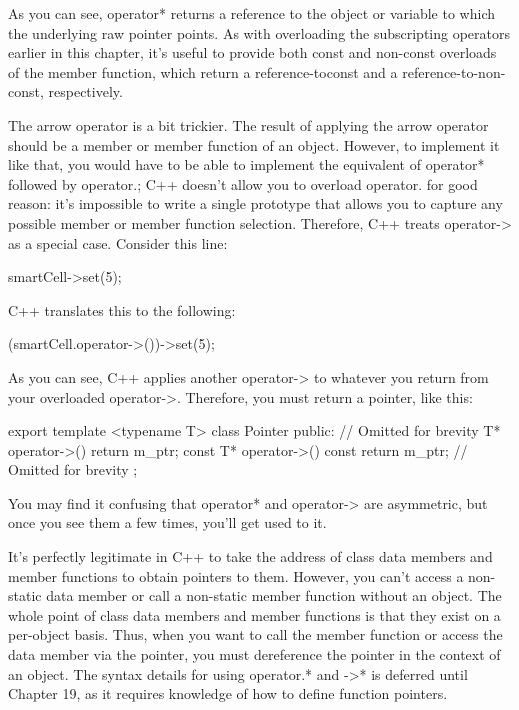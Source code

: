 As you can see, operator* returns a reference to the object or variable to which the underlying raw pointer points. As with overloading the subscripting operators earlier in this chapter, it’s useful to provide both const and non-const overloads of the member function, which return a reference-toconst and a reference-to-non-const, respectively.


The arrow operator is a bit trickier. The result of applying the arrow operator should be a member or member function of an object. However, to implement it like that, you would have to be able to implement the equivalent of operator* followed by operator.; C++ doesn’t allow you to overload operator. for good reason: it’s impossible to write a single prototype that allows you to capture any possible member or member function selection. Therefore, C++ treats operator-> as a special case.
Consider this line:

\begin{cpp}
smartCell->set(5);
\end{cpp}

C++ translates this to the following:

\begin{cpp}
(smartCell.operator->())->set(5);
\end{cpp}

As you can see, C++ applies another operator-> to whatever you return from your overloaded operator->. Therefore, you must return a pointer, like this:

\begin{cpp}
export template <typename T> class Pointer
{
    public:
        // Omitted for brevity
        T* operator->() { return m_ptr; }
        const T* operator->() const { return m_ptr; }
        // Omitted for brevity
};
\end{cpp}

You may find it confusing that operator* and operator-> are asymmetric, but once you see them a few times, you’ll get used to it.


It’s perfectly legitimate in C++ to take the address of class data members and member functions to obtain pointers to them. However, you can’t access a non-static data member or call a non-static member function without an object. The whole point of class data members and member functions is that they exist on a per-object basis. Thus, when you want to call the member function or access the data member via the pointer, you must dereference the pointer in the context of an object. The syntax details for using operator.* and ->* is deferred until Chapter 19, as it requires knowledge of how to define function pointers.

